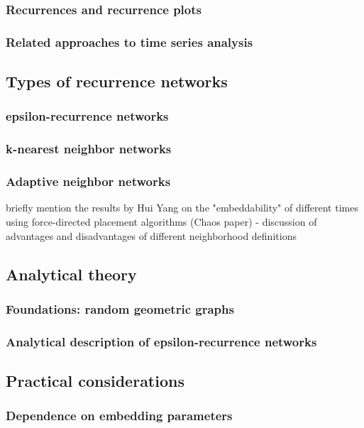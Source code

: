 		\subsubsection{Recurrences and recurrence plots}
		\subsubsection{Related approaches to time series analysis}

	\subsection{Types of recurrence networks}
		\subsubsection{epsilon-recurrence networks}
		\subsubsection{k-nearest neighbor networks}
		\subsubsection{Adaptive neighbor networks}

briefly mention the results by Hui Yang on the "embeddability" of different
times using force-directed placement algorithms (Chaos paper) - discussion of
advantages and disadvantages of different neighborhood definitions  

	\subsection{Analytical theory}
		\subsubsection{Foundations: random geometric graphs}
		\subsubsection{Analytical description of epsilon-recurrence networks}

	\subsection{Practical considerations}
		\subsubsection{Dependence on embedding parameters}
